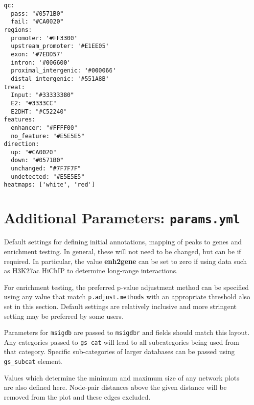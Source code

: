 \documentclass[
]{book}
\begin{document}
\begin{verbatim}
qc:
  pass: "#0571B0"
  fail: "#CA0020"
regions:
  promoter: '#FF3300'
  upstream_promoter: '#E1EE05'
  exon: '#7EDD57'
  intron: '#006600'
  proximal_intergenic: '#000066'
  distal_intergenic: '#551A8B'
treat:
  Input: "#33333380"
  E2: "#3333CC"
  E2DHT: "#C52240"
features:
  enhancer: "#FFFF00"
  no_feature: "#E5E5E5"
direction:
  up: "#CA0020"
  down: "#0571B0"
  unchanged: "#7F7F7F"
  undetected: "#E5E5E5"
heatmaps: ['white', 'red']
\end{verbatim}

\hypertarget{params-yml}{%
\section{\texorpdfstring{Additional Parameters: \texttt{params.yml}}{Additional Parameters: params.yml}}\label{params-yml}}

Default settings for defining initial annotations, mapping of peaks to genes and enrichment testing.
In general, these will not need to be changed, but can be if required.
In particular, the value \textbf{enh2gene} can be set to zero if using data such as H3K27ac HiChIP to determine long-range interactions.

For enrichment testing, the preferred p-value adjustment method can be specified using any value that match \texttt{p.adjust.methods} with an appropriate threshold also set in this section.
Default settings are relatively inclusive and more stringent setting may be preferred by some users.

Parameters for \texttt{msigdb}\citep{msigdb} are passed to \texttt{msigdbr}\citep{msigdbr} and fields should match this layout.
Any categories passed to \texttt{gs\_cat} will lead to all subcategories being used from that category.
Specific sub-categories of larger databases can be passed using \texttt{gs\_subcat} element.

Values which determine the minimum and maximum size of any network plots are also defined here.
Node-pair distances above the given distance will be removed from the plot and these edges excluded.
\end{document}
